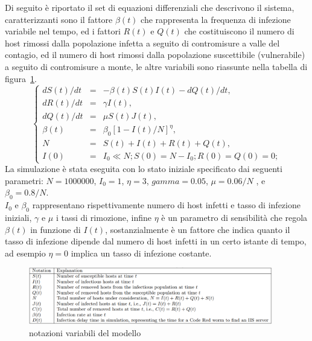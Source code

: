 Di seguito è riportato il set di equazioni differenziali che descrivono il sistema, caratterizzanti sono il fattore $\beta(t)$ che rappresenta la frequenza di infezione variabile nel tempo, ed i fattori $R(t)$ e $Q(t)$ che costituiscono il numero di host rimossi dalla popolazione infetta a seguito di contromisure a valle del contagio, ed il numero di host rimossi dalla popolazione suscettibile (vulnerabile) a seguito di contromisure a monte, le altre variabili sono riassunte nella tabella di figura~\ref{notations}.\\
\begin{equation}
\left\{  \begin{array}{rcl} 
                dS(t)/dt &=& -\beta(t)S(t)I(t) - dQ(t)/dt, \\ 
                dR(t)/dt &=& \gamma I(t), \\ 
                dQ(t)/dt &=& \mu S(t)J(t), \\ 
                \beta(t) &=& \beta_{0}[1 - I(t)/N]^{\eta}, \\ 
                N &=& S(t) + I(t) + R(t) + Q(t), \\
                I(0) &=& I_{0} \ll N; S(0) = N -I_{0}; R(0) = Q(0) = 0; 
           \end{array}  \right.
\end{equation}
La simulazione è stata eseguita con lo stato iniziale specificato dai seguenti parametri: $N = 1000000$, $I_{0} = 1$, $\eta = 3$, $gamma = 0.05$, $\mu = 0.06/N$ , e $\beta_{0} = 0.8/N$.\\
$I_{0}$ e $\beta_{0}$ rappresentano rispettivamente numero di host infetti e tasso di infezione iniziali, $\gamma$ e $\mu$ i tassi di rimozione, infine $\eta$ è un parametro di sensibilità che regola $\beta(t)$ in funzione di $I(t)$, sostanzialmente è un fattore che indica quanto il tasso di infezione dipende dal numero di host infetti in un certo istante di tempo, ad esempio $\eta = 0$ implica un tasso di infezione costante.\\
\begin{figure}[!hbp]
\centering
\includegraphics[width=0.95\textwidth]{images/notations.eps}
\caption{notazioni variabili del modello}
\label{notations}
\end{figure}
